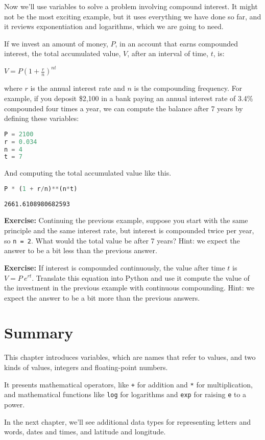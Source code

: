 Now we'll use variables to solve a problem involving compound interest.
It might not be the most exciting example, but it uses everything we
have done so far, and it reviews exponentiation and logarithms, which we
are going to need.

If we invest an amount of money, \(P\), in an account that earns
compounded interest, the total accumulated value, \(V\), after an
interval of time, \(t\), is:

\(V=P\left(1+{\frac {r}{n}}\right)^{nt}\)

where \(r\) is the annual interest rate and \(n\) is the compounding
frequency. For example, if you deposit \$2,100 in a bank paying an
annual interest rate of 3.4\% compounded four times a year, we can
compute the balance after 7 years by defining these variables:

\begin{lstlisting}[language=Python,style=source]
P = 2100
r = 0.034
n = 4
t = 7
\end{lstlisting}

And computing the total accumulated value like this.

\begin{lstlisting}[language=Python,style=source]
P * (1 + r/n)**(n*t)
\end{lstlisting}

\begin{lstlisting}[style=output]
2661.6108980682593
\end{lstlisting}

\textbf{Exercise:} Continuing the previous example, suppose you start
with the same principle and the same interest rate, but interest is
compounded twice per year, so \passthrough{\lstinline!n = 2!}. What
would the total value be after 7 years? Hint: we expect the answer to be
a bit less than the previous answer.

\textbf{Exercise:} If interest is compounded continuously, the value
after time \(t\) is \(V=P~e^{rt}\). Translate this equation into Python
and use it compute the value of the investment in the previous example
with continuous compounding. Hint: we expect the answer to be a bit more
than the previous answers.

\section{Summary}\label{summary}

This chapter introduces variables, which are names that refer to values,
and two kinds of values, integers and floating-point numbers.

It presents mathematical operators, like \passthrough{\lstinline!+!} for
addition and \passthrough{\lstinline!*!} for multiplication, and
mathematical functions like \passthrough{\lstinline!log!} for logarithms
and \passthrough{\lstinline!exp!} for raising
\passthrough{\lstinline!e!} to a power.

In the next chapter, we'll see additional data types for representing
letters and words, dates and times, and latitude and longitude.
